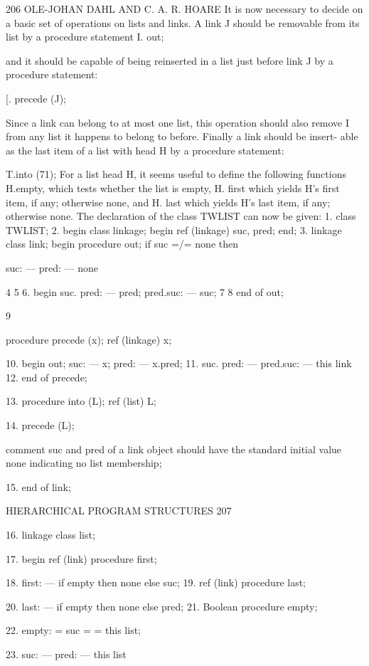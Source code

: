 {{{{{		206 OLE-JOHAN DAHL AND C. A. R. HOARE It is now necessary to decide on a basic set of operations on lists and links. A link J should be removable from its list by a procedure statement I. out;
		
		and it should be capable of being reinserted in a list just before link J by a procedure statement:
		
		[. precede (J);
		
		Since a link can belong to at most one list, this operation should also remove I from any list it happens to belong to before. Finally a link should be insert- able as the last item of a list with head H by a procedure statement:
		
		T.into (71); For a list head H, it seems useful to define the following functions H.empty, which tests whether the list is empty, H. first which yields H’s first item, if any; otherwise none, and H. last which yields H’s last item, if any; otherwise none. The declaration of the class TWLIST can now be given: 1. class TWLIST; 2. begin class linkage; begin ref (linkage) suc, pred; end; 3. linkage class link; begin procedure out; if suc =/= none then
		
		suc: — pred: — none
		
		4 5 6. begin suc. pred: — pred; pred.suc: — suc; 7 8 end of out;
		
		9
		
		procedure precede (x); ref (linkage) x;
		
		10. begin out; suc: — x; pred: — x.pred; 11. suc. pred: — pred.suc: — this link 12. end of precede;
		
		13. procedure into (L); ref (list) L;
		
		14. precede (L);
		
		comment suc and pred of a link object should have the standard initial value none indicating no list membership;
		
		15. end of link;
		
		HIERARCHICAL PROGRAM STRUCTURES 207
		
		16. linkage class list;
		
		17. begin ref (link) procedure first;
		
		18. first: — if empty then none else suc; 19. ref (link) procedure last;
		
		20. last: — if empty then none else pred; 21. Boolean procedure empty;
		
		22. empty: = suc = = this list;
		
		23. suc: — pred: — this list
		
}}}}}
